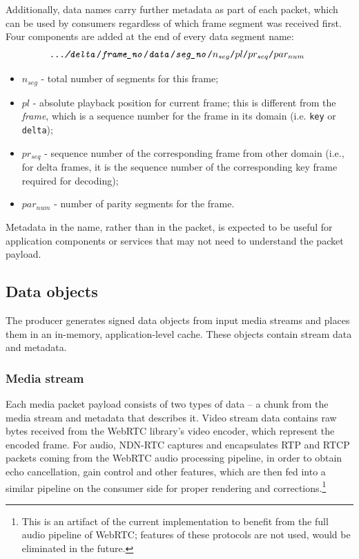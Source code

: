 \documentclass{icn/sig-alternate-2013} %
\newcommand{\ndnrtcName}{NDN-RTC} %
\begin{document}
Additionally, data names carry further metadata as part of each packet, which can be used by consumers regardless of which frame segment was received first. 
Four components are added at the end of every data segment name:
\small\begin{equation}
\texttt{\textit{.../delta}/\textit{frame\_no}/\textit{data}/\textit{seg\_no}/\textbf{$n_{seg}$}/\textbf{$pl$}/\textbf{$pr_{seq}$}/\textbf{$par_{num}$} \nonumber}
\end{equation}\normalsize
\begin{itemize}[label={}]
\item \texttt{$n_{seg}$} - total number of segments for this frame;
\item \texttt{$pl$} - absolute playback position for current frame; this is different from the \textit{frame}, which is a sequence number for the frame in its domain (i.e. \texttt{key} or \texttt{delta});
\item \texttt{$pr_{seq}$} - sequence number of the corresponding frame from other domain (i.e., for delta frames, it is the sequence number of the corresponding key frame required for decoding);
\item \texttt{$par_{num}$} - number of parity segments for the frame.
\end{itemize}
Metadata in the name, rather than in the packet, is expected to be useful for application components or services that may not need to understand the packet payload. 

\subsection{Data objects}
The producer generates signed data objects from input media streams and places them in an in-memory, application-level cache.  These objects contain stream data and metadata.

\subsubsection{Media stream}
Each media packet payload consists of two types of data -- a chunk from the media stream and metadata that describes it. Video stream data contains raw bytes received from the WebRTC library's video encoder, which represent the encoded frame. For audio, \ndnrtcName{} captures and encapsulates RTP and RTCP packets coming from the WebRTC audio processing pipeline, in order to obtain echo cancellation, gain control and other features, which are then fed into a similar pipeline on the consumer side for proper rendering and corrections.\footnote{This is an artifact of the current implementation to benefit from the full audio pipeline of WebRTC; features of these protocols are not used, would be eliminated in the future.}
\end{document}
